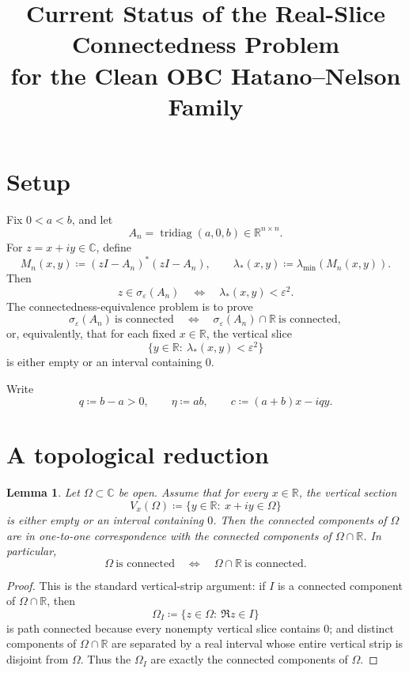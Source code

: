 \documentclass[11pt]{article}
\title{Current Status of the Real-Slice Connectedness Problem\\
for the Clean OBC Hatano--Nelson Family}
\author{}
\date{}
\newtheorem{lemma}[theorem]{Lemma}
\newcommand{\C}{\mathbb C}
\newcommand{\R}{\mathbb R}
\newcommand{\eps}{\varepsilon}
\begin{document}
\maketitle

\section{Setup}

Fix \(0<a<b\), and let
\[
A_n=\operatorname{tridiag}(a,0,b)\in\R^{n\times n}.
\]
For \(z=x+iy\in\C\), define
\[
M_n(x,y)\coloneqq (zI-A_n)^*(zI-A_n),
\qquad
\lambda_*(x,y)\coloneqq \lambda_{\min}(M_n(x,y)).
\]
Then
\[
z\in\sigma_\eps(A_n)
\quad\Longleftrightarrow\quad
\lambda_*(x,y)<\eps^2.
\]
The connectedness-equivalence problem is to prove
\[
\sigma_\eps(A_n)\ \text{is connected}
\quad\Longleftrightarrow\quad
\sigma_\eps(A_n)\cap\R\ \text{is connected},
\]
or, equivalently, that for each fixed \(x\in\R\), the vertical slice
\[
\{y\in\R:\ \lambda_*(x,y)<\eps^2\}
\]
is either empty or an interval containing \(0\).

Write
\[
q\coloneqq b-a>0,
\qquad
\eta\coloneqq ab,
\qquad
c\coloneqq (a+b)x-iqy.
\]

\section{A topological reduction}

\begin{lemma}\label{lem:topological}
Let \(\Omega\subset\C\) be open. Assume that for every \(x\in\R\), the vertical section
\[
V_x(\Omega)\coloneqq \{y\in\R:\ x+iy\in\Omega\}
\]
is either empty or an interval containing \(0\). Then the connected components of
\(\Omega\) are in one-to-one correspondence with the connected components of
\(\Omega\cap\R\). In particular,
\[
\Omega\ \text{is connected}
\quad\Longleftrightarrow\quad
\Omega\cap\R\ \text{is connected}.
\]
\end{lemma}

\begin{proof}
This is the standard vertical-strip argument: if \(I\) is a connected component of
\(\Omega\cap\R\), then
\[
\Omega_I\coloneqq \{z\in\Omega:\ \Re z\in I\}
\]
is path connected because every nonempty vertical slice contains \(0\); and distinct
components of \(\Omega\cap\R\) are separated by a real interval whose entire vertical strip
is disjoint from \(\Omega\). Thus the \(\Omega_I\) are exactly the connected components of
\(\Omega\).
\end{proof}
\end{document}
